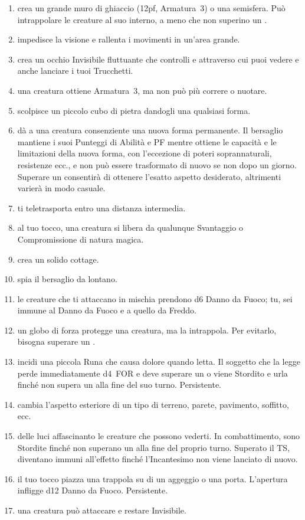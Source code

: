 \documentclass[itdr]{subfiles}
\begin{document}
\begin{enumerate}
	\item {} crea un grande muro di ghiaccio (12pf, Armatura~3) o una semisfera. Può intrappolare le creature al suo interno, a meno che non superino un .
	\item {} impedisce la visione e rallenta i movimenti in un'area grande.
	\item {} crea un occhio Invisibile fluttuante che controlli e attraverso cui puoi vedere e anche lanciare i tuoi Trucchetti.
	\item {} una creatura ottiene Armatura~3, ma non può più correre o nuotare.
	\item {} scolpisce un piccolo cubo di pietra dandogli una qualsiasi forma.
	\item {} dà a una creatura consenziente una nuova forma permanente. Il bersaglio mantiene i suoi Punteggi di Abilità e PF mentre ottiene le capacità e le limitazioni della nuova forma, con l'eccezione di poteri soprannaturali, resistenze ecc., e non può essere trasformato di nuovo se non dopo un giorno. Superare un  consentirà di ottenere l'esatto aspetto desiderato, altrimenti varierà in modo casuale.
	\item {} ti teletrasporta entro una distanza intermedia.
	\item {} al tuo tocco, una creatura si libera da qualunque Svantaggio o Compromissione di natura magica.
	\item {} crea un solido cottage.
	\item {} spia il bersaglio da lontano.
	\item {} le creature che ti attaccano in mischia prendono d6 Danno da Fuoco; tu, sei immune al Danno da Fuoco e a quello da Freddo.
	\item {} un globo di forza protegge una creatura, ma la intrappola. Per evitarlo, bisogna superare un .
	\item {} incidi una piccola Runa che causa dolore quando letta. Il soggetto che la legge perde immediatamente d4~FOR e deve superare un  o viene Stordito e urla finché non supera un  alla fine del suo turno. Persistente.
	\item {} cambia l'aspetto esteriore di un tipo di terreno, parete, pavimento, soffitto, ecc.
	\item {} delle luci affascinanto le creature che possono vederti. In combattimento, sono Stordite finché non superano un  alla fine del proprio turno. Superato il TS, diventano immuni all'effetto finché l'Incantesimo non viene lanciato di nuovo.
	\item {} il tuo tocco piazza una trappola su di un aggeggio o una porta. L'apertura infligge d12 Danno da Fuoco. Persistente.
	\item {} una creatura può attaccare e restare Invisibile.
\end{enumerate}
\end{document}
